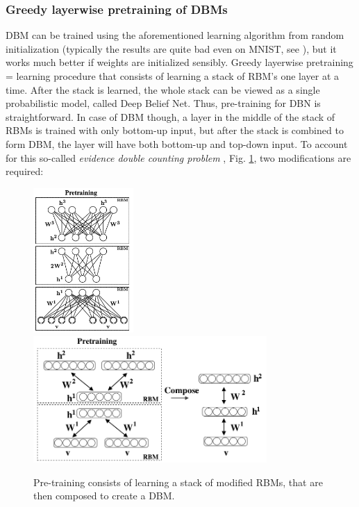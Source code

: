 \subsubsection{Greedy layerwise pretraining of DBMs}
DBM can be trained using the aforementioned learning algorithm from random initialization (typically the results are quite bad even on MNIST, see \cite{goodfellow2012joint, goodfellow2016deep}), but it works much better if weights are initialized sensibly. Greedy layerwise pretraining = learning procedure that consists of learning a stack of RBM's one layer at a time. After the stack is learned, the whole stack can be viewed as a single probabilistic model, called Deep Belief Net. Thus, pre-training for DBN is straightforward. In case of DBM though, a layer in the middle of the stack of RBMs is trained with only bottom-up input, but after the stack is combined to form DBM, the layer will have both bottom-up and top-down input. To account for this so-called \emph{evidence double counting problem} \cite{salakhutdinov2009deep, goodfellow2016deep}, Fig. \ref{fig:dbm_pretraining}, two modifications are required:
\begin{figure}[h]
\begin{mdframed}
\includegraphics[width=1.5in]{img/dbm_pretraining2.png}
\quad
\quad
\includegraphics[width=3.5in]{img/dbm_pretraining.png}
\centering
\caption{Pre-training consists of learning a stack of modified RBMs, that are then composed to create a DBM.}
\label{fig:dbm_pretraining}
\end{mdframed}
\end{figure}
